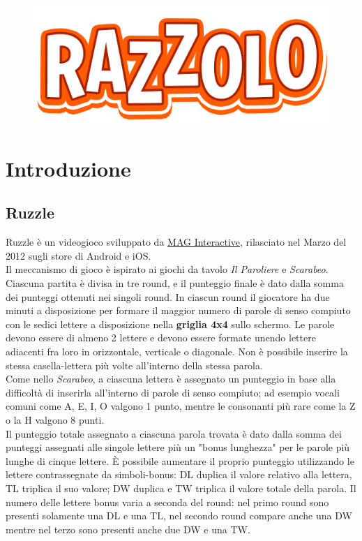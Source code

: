 \documentclass[10pt,a4paper]{article}
\title{}
\author{Antonio Facchiano\\Salvatore Ruocco\\Simone Vittoria}
\date{10 Gennaio 2024}
\begin{document}
	\begin{figure}
		\centering
		\includegraphics[scale=0.5]{icon}
	\end{figure}
	
	\maketitle
	\newpage
	{
		\hypersetup{linkcolor=black}
		\tableofcontents
	}
	\newpage
	\section{Introduzione}
	\subsection{Ruzzle}
	Ruzzle è un videogioco sviluppato da \href{https://www.maginteractive.com}{MAG Interactive}, rilasciato nel Marzo del 2012 sugli store di Android e iOS.\\
	Il meccanismo di gioco è ispirato ai giochi da tavolo \textit{Il Paroliere} e \textit{Scarabeo}.\\
	Ciascuna partita è divisa in tre round, e il punteggio finale è dato dalla somma dei punteggi ottenuti nei singoli round. In ciascun round il giocatore ha due minuti a disposizione per formare il maggior numero di parole di senso compiuto con le sedici lettere a disposizione nella \textbf{griglia 4x4} sullo schermo. Le parole devono essere di almeno 2 lettere e devono essere formate unendo lettere adiacenti fra loro in orizzontale, verticale o diagonale. Non è possibile inserire la stessa casella-lettera più volte all'interno della stessa parola.\\
	Come nello \textit{Scarabeo}, a ciascuna lettera è assegnato un punteggio in base alla difficoltà di inserirla all'interno di parole di senso compiuto; ad esempio vocali comuni come A, E, I, O valgono 1 punto, mentre le consonanti più rare come la Z o la H valgono 8 punti.\\
	Il punteggio totale assegnato a ciascuna parola trovata è dato dalla somma dei punteggi assegnati alle singole lettere più un "bonus lunghezza" per le parole più lunghe di cinque lettere. È possibile aumentare il proprio punteggio utilizzando le lettere contrassegnate da simboli-bonus: DL duplica il valore relativo alla lettera, TL triplica il suo valore; DW duplica e TW triplica il valore totale della parola. Il numero delle lettere bonus varia a seconda del round: nel primo round sono presenti solamente una DL e una TL, nel secondo round compare anche una DW mentre nel terzo sono presenti anche due DW e una TW. 
\end{document}
